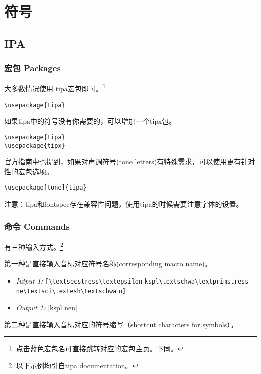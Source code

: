 \documentclass[a4paper,12pt]{article}
\begin{document}
\section{符号}
\subsection{IPA}
\subsubsection{宏包 Packages}
大多数情况使用 \href{https://www.ctan.org/pkg/tipa}{tipa}宏包即可。\footnote{点击蓝色宏包名可直接跳转对应的宏包主页。下同。} 

\verb|\usepackage{tipa}|

\vspace{3mm}
如果tipa中的符号没有你需要的，可以增加一个tipx包。

\verb|\usepackage{tipa}|\\
\indent \verb|\usepackage{tipx}|

\vspace{3mm}
官方指南中也提到，如果对声调符号(tone letters)有特殊需求，可以使用更有针对性的宏包选项。

\verb|\usepackage[tone]{tipa}|

\vspace{3mm}
注意：tipa和fontspec存在兼容性问题，使用tipa的时候需要注意字体的设置。

\subsubsection{命令 Commands}

有三种输入方式。\footnote{以下示例均引自\href{https://ftp.snt.utwente.nl/pub/software/tex/fonts/tipa/tipa/doc/tipaman.pdf}{tipa documentation}。}

\vspace{5mm}
第一种是直接输入音标对应符号名称(corresponding macro name)。

\begin{itemize}
	\item \textit{Iutput 1:} \verb|[\textsecstress\textepsilon| \verb|kspl\textschwa\textprimstress| \verb|ne\textsci\textesh\textschwa| \verb|n]|
	\item \textit{Output 1:} [\textsecstress\textepsilon kspl\textschwa
	\textprimstress ne\textsci\textesh\textschwa n]
\end{itemize}

第二种是直接输入音标对应的符号缩写（shortcut
characters for symbols）。
\end{document}

